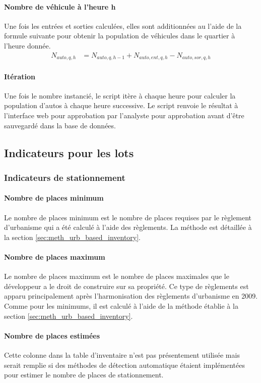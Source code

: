             \paragraph{Nombre de véhicule à l'heure h} Une fois les entrées et sorties calculées, elles sont additionnées au l'aide de la formule suivante pour obtenir la population de véhicules dans le quartier à l'heure donnée.
            \begin{align}
                N_{auto,q,h} &=  N_{auto,q,h-1} + N_{auto,ent,q,h}-N_{auto,sor,q,h}
            \end{align}
            \paragraph{Itération} Une fois le nombre instancié, le script itère à chaque heure pour calculer la population d'autos à chaque heure successive. Le script renvoie le résultat à l'interface web pour approbation par l'analyste pour approbation avant d'être sauvegardé dans la base de données.
    \subsection{Indicateurs pour les lots}
        \subsubsection{Indicateurs de stationnement}
            \paragraph{Nombre de places minimum} Le nombre de places minimum est le nombre de places requises par le règlement d'urbanisme qui a été calculé à l'aide des règlements. La méthode est détaillée à la section \ref{sec:meth_urb_based_inventory}.
            
            \paragraph{Nombre de places maximum} Le nombre de places maximum est le nombre de places maximales que le développeur a le droit de construire sur sa propriété. Ce type de règlements est apparu principalement après l'harmonisation des règlements d'urbanisme en 2009. Comme pour les minimums, il est calculé à l'aide de la méthode établie à la section \ref{sec:meth_urb_based_inventory}.
            
            \paragraph{Nombre de places estimées} Cette colonne dans la table d'inventaire n'est pas présentement utilisée mais serait remplie si des méthodes de détection automatique étaient implémentées pour estimer le nombre de places de stationnement.
            

